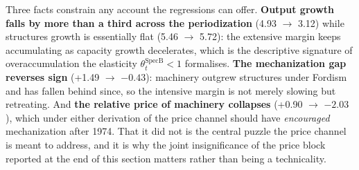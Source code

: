 \documentclass[11pt,a4paper]{article}
\begin{document}
Three facts constrain any account the regressions can offer. \textbf{Output growth falls by more than a third across the periodization} (4.93 $\to$ 3.12) while structures growth is essentially flat (5.46 $\to$ 5.72): the extensive margin keeps accumulating as capacity growth decelerates, which is the descriptive signature of overaccumulation the elasticity $\theta_t^{\text{SpecB}} < 1$ formalises. \textbf{The mechanization gap reverses sign} (+1.49 $\to$ $-0.43$): machinery outgrew structures under Fordism and has fallen behind since, so the intensive margin is not merely slowing but retreating. And \textbf{the relative price of machinery collapses} (+0.90 $\to$ $-2.03$), which under either derivation of the price channel should have \textit{encouraged} mechanization after 1974. That it did not is the central puzzle the price channel is meant to address, and it is why the joint insignificance of the price block reported at the end of this section matters rather than being a technicality.
\end{document}
